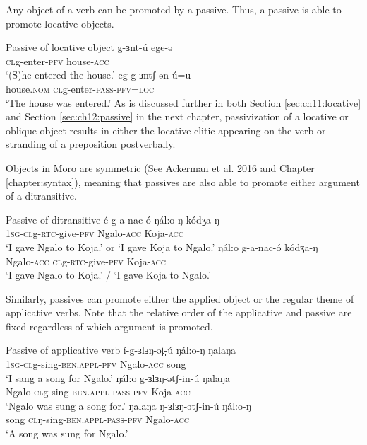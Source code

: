 Any object of a verb can be promoted by a passive. Thus, a passive is able to promote locative objects. 

\ea Passive of locative object
\ea \gll  g-ɜnt-ú ege-ə\\
\textsc{cl}g-enter-\textsc{pfv} house-\textsc{acc}\\
\glt  `(S)he entered the house.'
\ex \gll  eg g-ɜntʃ-ən-ú=u\\
house.\textsc{nom} \textsc{cl}g-enter-\textsc{pass-pfv=loc} \\
\glt  `The house was entered.'
\z 
\z 
As is discussed further in both Section \ref{sec:ch11:locative} and Section \ref{sec:ch12:passive} in the next chapter, passivization of a locative or oblique object results in either the locative clitic appearing on the verb or stranding of a preposition postverbally.

Objects in Moro are symmetric (See Ackerman et al. 2016 and Chapter \ref{chapter:syntax}), meaning that passives are also able to promote either argument of a ditransitive.

\ea Passive of ditransitive
\ea \gll  é-g-a-nac-ó ŋál:o-ŋ kódʒa-ŋ\\
\textsc{1sg-cl}g-\textsc{rtc}-give-\textsc{pfv} Ngalo-\textsc{acc} Koja-\textsc{acc}\\
\glt  `I gave Ngalo to Koja.' or `I gave Koja to Ngalo.'
\ex \gll  ŋál:o g-a-nac-ó  kódʒa-ŋ\\
Ngalo-\textsc{acc}  \textsc{cl}g-\textsc{rtc}-give-\textsc{pfv}  Koja-\textsc{acc}\\
\glt  `I gave Ngalo to Koja.' / `I gave Koja to Ngalo.'
\z 
\z

Similarly, passives can promote either the applied object or the regular theme of applicative verbs. Note that the relative order of the applicative and passive are fixed regardless of which argument is promoted.
 
\ea Passive of applicative verb
\ea \gll  í-g-ɜlɜŋ-ət̪-ú ŋál:o-ŋ ŋalaŋa\\
\textsc{1sg-cl}g-sing-\textsc{ben.appl-pfv} Ngalo-\textsc{acc} song\\
\glt  `I sang a song for Ngalo.'
\ex \gll  ŋál:o g-ɜlɜŋ-ətʃ-in-ú ŋalaŋa\\
Ngalo  \textsc{cl}g-sing-\textsc{ben.appl-pass-pfv}  Koja-\textsc{acc}\\
\glt  `Ngalo was sung a song for.'
\ex \gll  ŋalaŋa ŋ-ɜlɜŋ-ətʃ-in-ú   ŋál:o-ŋ\\
song  \textsc{cl}ŋ-sing-\textsc{ben.appl-pass-pfv}  Ngalo-\textsc{acc}\\
\glt  `A song was sung for Ngalo.'
\z
\z

